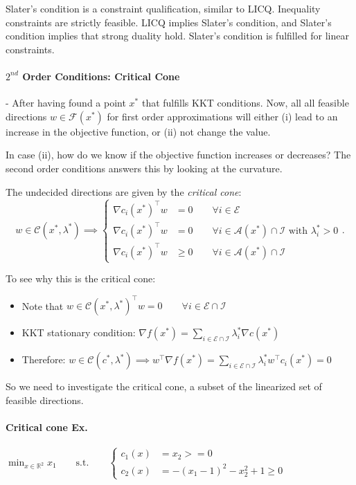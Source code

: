 \documentclass{article}
\begin{document}
\medskip Slater's condition is a constraint qualification, similar to LICQ. Inequality constraints are strictly feasible. LICQ implies Slater's condition, and Slater's condition implies that strong duality hold. 
Slater's condition is fulfilled for linear constraints. 

\paragraph{$2^{nd}$ Order Conditions: Critical Cone} - After having found a point $x^*$ that fulfills KKT conditions. Now, all 
all feasible directions $w \in \mathcal{F}(x^*)$ for first order approximations will either (i) lead to an increase in the objective function, or (ii) not change the value. 

\medskip
In case (ii), how do we know if the objective function increases or decreases? The second order conditions answers this by looking 
at the curvature. 


\medskip The undecided directions are given by the \textit{critical cone}: 
\[
  w\in\mathcal{C}(x^*, \lambda^*) \implies \left\{
    \begin{aligned}
      \nabla c_i (x^*)^{\top}w &= 0 \qquad \forall i\in \mathcal{E} \\
      \nabla c_i (x^*)^{\top}w &= 0 \qquad \forall i\in \mathcal{A}(x^*) \cap \mathcal{I} \text{ with } \lambda_i^* > 0 \\
      \nabla c_i(x^*)^{\top}w &\geq 0 \qquad \forall i\in \mathcal{A}(x^*) \cap \mathcal{I}
    \end{aligned}
  \right.
.\] 

To see why this is the critical cone: 
\begin{itemize}
  \item Note that $w \in\mathcal{C}(x^*, \lambda^*)^{\top}w = 0 \qquad \forall i\in \mathcal{E}\cap\mathcal{I}$
  \item KKT stationary condition: $\nabla f(x^*) = \sum_{i\in\mathcal{E}\cap\mathcal{I}}\lambda_i ^*\nabla c(x^*)$
  \item Therefore: $w\in \mathcal{C}(c^*, \lambda^*) \implies w^{\top}\nabla f(x^*) = \sum_{i\in \mathcal{E} \cap \mathcal{I}}\lambda_i^* w^{\top}c_i (x^*) = 0$
\end{itemize}

So we need to investigate the critical cone, a subset of the linearized set of feasible directions. 

\paragraph{Critical cone Ex.} $\min_{x\in \mathbb{R}^{2}} x_1 \qquad \text{s.t.} \qquad 
\left\{
  \begin{aligned}
    c_1(x) &= x_2 >= 0 \\
    c_2(x) & = -(x_1-1)^2 - x_2^2 + 1 \geq 0 
  \end{aligned}
\right.
$
\end{document}
